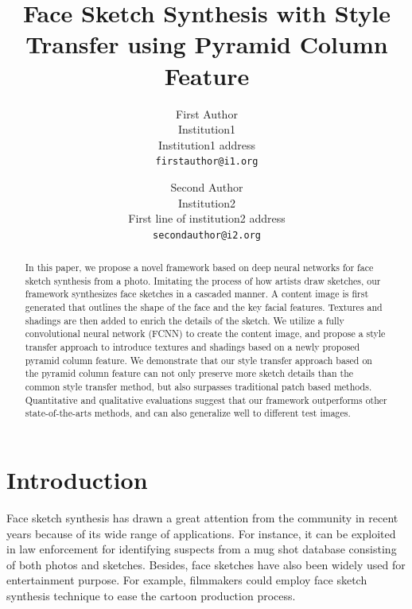 \documentclass[10pt,twocolumn,letterpaper]{article}
\begin{document}
\title{Face Sketch Synthesis with Style Transfer using Pyramid Column Feature}

\author{First Author\\
Institution1\\
Institution1 address\\
{\tt\small firstauthor@i1.org}
\and
Second Author\\
Institution2\\
First line of institution2 address\\
{\tt\small secondauthor@i2.org}
}

\maketitle


\begin{abstract}

In this paper, we propose a novel framework based on deep neural networks for face sketch synthesis from a photo. Imitating the process of how artists draw sketches, our framework synthesizes face sketches in a cascaded manner. A content image is first generated that outlines the shape of the face and the key facial features. Textures and shadings are then added to enrich the details of the sketch. We utilize a fully convolutional neural network (FCNN) to create the content image, and propose a style transfer approach to introduce textures and shadings based on a newly proposed pyramid column feature. We demonstrate that our style transfer approach based on the pyramid column feature can not only preserve more sketch details than the common style transfer method, but also surpasses traditional patch based methods. Quantitative and qualitative evaluations suggest that our framework outperforms other state-of-the-arts methods, and can also generalize well to different test images.

\end{abstract}

\section{Introduction}
Face sketch synthesis has drawn a great attention from the community in recent years because of its wide range of applications. For instance, it can be exploited in law enforcement for identifying suspects from a mug shot database consisting of both photos and sketches. Besides, face sketches have also been widely used for entertainment purpose. For example, filmmakers could employ face sketch synthesis technique to ease the cartoon production process.
\end{document}
